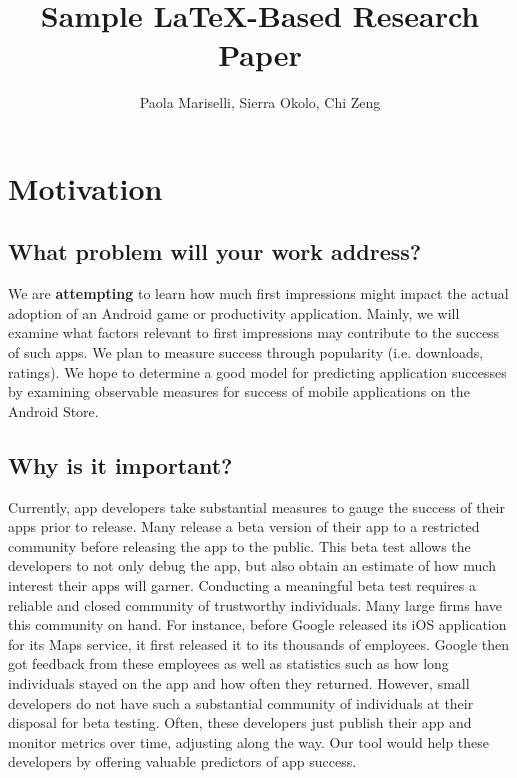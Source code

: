 \documentclass{article}
\title{Sample \LaTeX-Based Research Paper}
\author{Paola Mariselli, Sierra Okolo, Chi Zeng}
\date{}
\begin{document}
\maketitle


\section{Motivation}

\subsection{What problem will your work address?}

We are \textbf{attempting} to learn how much first impressions might impact the actual adoption of an Android game or productivity application. Mainly, we will examine what factors relevant to first impressions may contribute to the success of such apps. We plan to measure success through popularity (i.e. downloads, ratings). We hope to determine a good model for predicting application successes by examining observable measures for success of mobile applications on the Android Store.

\subsection{Why is it important?}

Currently, app developers take substantial measures to gauge the success of their apps prior to release. Many release a beta version of their app to a restricted community before releasing the app to the public. This beta test allows the developers to not only debug the app, but also obtain an estimate of how much interest their apps will garner. Conducting a meaningful beta test requires a reliable and closed community of trustworthy individuals. Many large firms have this community on hand. For instance, before Google released its iOS application for its Maps service, it first released it to its thousands of employees. Google then got feedback from these employees as well as statistics such as how long individuals stayed on the app and how often they returned. However, small developers do not have such a substantial community of individuals at their disposal for beta testing. Often, these developers just publish their app and monitor metrics over time, adjusting along the way. Our tool would help these developers by offering valuable predictors of app success. \\
\end{document}
